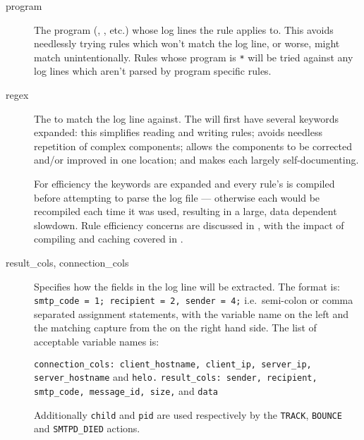 \begin{description}
    \item [program] The program (, , etc.) whose
        log lines the rule applies to.  This avoids needlessly trying rules
        which won't match the log line, or worse, might match
        unintentionally.  Rules whose program is \texttt{*} will be tried
        against any log lines which aren't parsed by program specific
        rules.

    \item [regex] The \regex{} to match the log line against.  The \regex{}
        will first have several keywords expanded: this simplifies reading
        and writing rules; avoids needless repetition of complex \regex{}
        components; allows the components to be corrected and/or improved
        in one location; and makes each \regex{} largely self-documenting.

        For efficiency the keywords are expanded and every rule's \regex{}
        is compiled before attempting to parse the log file --- otherwise
        each \regex{} would be recompiled each time it was used, resulting
        in a large, data dependent slowdown.  Rule efficiency concerns are
        discussed in , with the impact of
        compiling and caching \regexes{} covered in .

    \item [result\_cols, connection\_cols] Specifies how the fields in the
        log line will be extracted.  The format is:
        \newline \tab{} \texttt{smtp\_code = 1; recipient = 2, sender = 4;}
        \newline i.e.\ semi-colon or comma separated assignment statements,
        with the variable name on the left and the matching capture from
        the \regex{} on the right hand side.  The list of acceptable
        variable names is:

        \texttt{connection\_cols: client\_hostname, client\_ip, server\_ip,
        \newline \tab{} server\_hostname} and \texttt{helo.\newline}
        \texttt{result\_cols: sender, recipient, smtp\_code, message\_id,
        \newline \tab{} size,} and \texttt{data}

        Additionally \texttt{child} and \texttt{pid} are used respectively
        by the \texttt{TRACK}, \texttt{BOUNCE} and \texttt{SMTPD\_DIED}
        actions.


\end{description}
